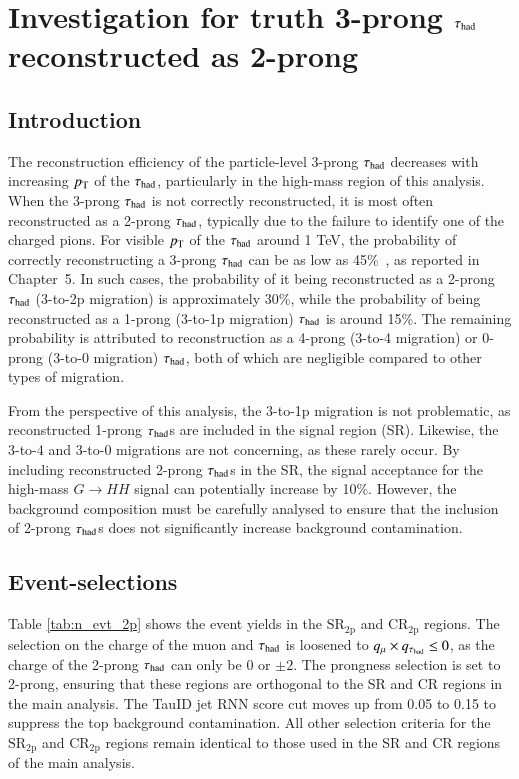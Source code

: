 
\chapter{Investigation for truth 3-prong $\tau_{\text{had}}$ reconstructed as 2-prong}
\graphicspath{{2_Appendices/figures}}

\section*{Introduction}
    The reconstruction efficiency of the particle-level 3-prong $\tau_{\text{had}}$ decreases with increasing $p_{\text{T}}$ of the $\tau_{\text{had}}$, 
    particularly in the high-mass region of this analysis. When the 3-prong $\tau_{\text{had}}$ is not correctly reconstructed, 
    it is most often reconstructed as a 2-prong $\tau_{\text{had}}$, typically due to the failure to identify one of the charged pions. 
    For visible $p_{\text{T}}$ of the $\tau_{\text{had}}$ around 1 TeV, the probability of correctly reconstructing a 3-prong $\tau_{\text{had}}$ can be as low as 
    45\%~\cite{ATL-PHYS-PUB-2022-044}, as reported in Chapter~5. In such cases, the probability of it being 
    reconstructed as a 2-prong $\tau_{\text{had}}$ (3-to-2p migration) is approximately 30\%, while the probability of being 
    reconstructed as a 1-prong (3-to-1p migration) $\tau_{\text{had}}$ is around 15\%. The remaining probability is attributed 
    to reconstruction as a 4-prong (3-to-4 migration) or 0-prong (3-to-0 migration) $\tau_{\text{had}}$, both of which are negligible compared to other types of migration.

    From the perspective of this analysis, the 3-to-1p migration is not problematic, as reconstructed 
    1-prong $\tau_{\text{had}}$s are included in the signal region (SR). Likewise, the 3-to-4 and 3-to-0 migrations 
    are not concerning, as these rarely occur. By including reconstructed 2-prong $\tau_{\text{had}}$s in the SR, 
    the signal acceptance for the high-mass $G\rightarrow HH$ signal can potentially increase by 10\%. 
    However, the background composition must be carefully analysed to ensure that the inclusion of 
    2-prong $\tau_{\text{had}}$s does not significantly increase background contamination.

\section*{Event-selections}
    Table \ref{tab:n_evt_2p} shows the event yields in the $\mathrm{SR}_\mathrm{2p}$ and 
    $\mathrm{CR}_\mathrm{2p}$ regions. The selection on the charge of the muon and $\tau_{\text{had}}$ 
    is loosened to $q_{\mu}\times q_{\tau_{\text{had}}}\leq 0$, as the charge of the 2-prong 
    $\tau_{\text{had}}$ can only be 0 or $\pm 2$. The prongness selection is set to 2-prong, 
    ensuring that these regions are orthogonal to the SR and CR regions in the main analysis. 
    The TauID jet RNN score cut moves up from 0.05 to 0.15 to suppress the top background contamination.
    All other selection criteria for the $\mathrm{SR}_\mathrm{2p}$ and $\mathrm{CR}_\mathrm{2p}$ 
    regions remain identical to those used in the SR and CR regions of the main analysis.

